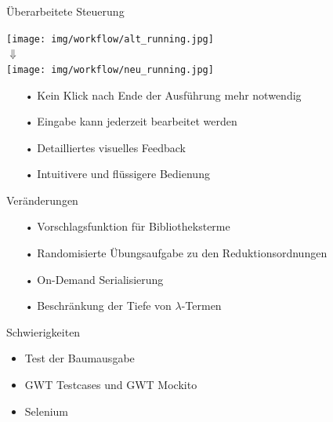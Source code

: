 \documentclass[10pt]{beamer}
\begin{document}
\begin{frame}{Überarbeitete Steuerung}
\begin{center}
\texttt{[image: img/workflow/alt\_running.jpg]}\\[0.4cm]

{\Huge $\Downarrow$}\\[0.4cm]

\texttt{[image: img/workflow/neu\_running.jpg]}\\[0.4cm]

\begin{itemize}
	\item[•] Kein Klick nach Ende der Ausführung mehr notwendig
	\item[•] Eingabe kann jederzeit bearbeitet werden
	\item[•] Detailliertes visuelles Feedback
	\item[•] Intuitivere und flüssigere Bedienung
\end{itemize}
\end{center}
\end{frame}

\begin{frame}{Veränderungen}
\begin{itemize}
	\item[•] Vorschlagsfunktion für Bibliotheksterme
	\item[•] Randomisierte Übungsaufgabe zu den Reduktionsordnungen
	\item[•] On-Demand Serialisierung
	\item[•] Beschränkung der Tiefe von $\lambda$-Termen
\end{itemize}
\end{frame}

\begin{frame}{Schwierigkeiten}
\begin{itemize}
	\setlength{\itemsep}{10pt}
	\item Test der Baumausgabe
	\item GWT Testcases und GWT Mockito 
	\item Selenium
\end{itemize}
\end{frame}
\end{document}
